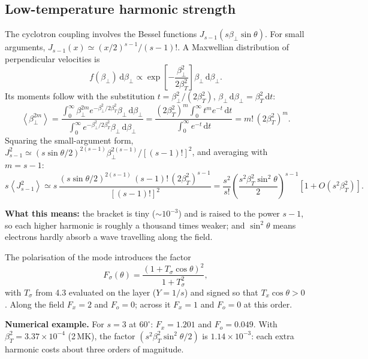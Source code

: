 \documentclass[11pt,a4paper]{article}
\newcommand{\dd}{\mathrm{d}}
\newcommand{\example}[1]{\par\noindent\colorbox{boxbg}{\parbox{\dimexpr\linewidth-2\fboxsep}{\small\textbf{Numerical example.} #1}}\par}
\newcommand{\whatitmeans}[1]{\par{\color{head}\textbf{What this means:}} #1\par}
\begin{document}
\subsection{Low-temperature harmonic strength}
The cyclotron coupling involves the Bessel functions $J_{s-1}(s\beta_\perp\sin\theta)$. For small
arguments, $J_{s-1}(x)\simeq(x/2)^{s-1}/(s-1)!$. A Maxwellian distribution of perpendicular
velocities is
\begin{equation}
  f(\beta_\perp)\,\dd\beta_\perp\propto\exp\!\left[-\frac{\beta_\perp^2}{2\beta_T^2}\right]\beta_\perp\,\dd\beta_\perp .
\end{equation}
Its moments follow with the substitution $t=\beta_\perp^2/(2\beta_T^2)$, $\beta_\perp\,\dd\beta_\perp=\beta_T^2\,\dd t$:
\begin{equation}
  \left\langle\beta_\perp^{2m}\right\rangle
  =\frac{\int_0^\infty\beta_\perp^{2m}e^{-\beta_\perp^2/2\beta_T^2}\beta_\perp\,\dd\beta_\perp}{\int_0^\infty e^{-\beta_\perp^2/2\beta_T^2}\beta_\perp\,\dd\beta_\perp}
  =\frac{(2\beta_T^2)^m\int_0^\infty t^me^{-t}\,\dd t}{\int_0^\infty e^{-t}\,\dd t}=m!\,(2\beta_T^2)^m .
\end{equation}
Squaring the small-argument form, $J_{s-1}^2\simeq(s\sin\theta/2)^{2(s-1)}\beta_\perp^{2(s-1)}/[(s-1)!]^2$, and averaging with $m=s-1$:
\begin{equation}
  s\left\langle J_{s-1}^2\right\rangle\simeq s\,\frac{(s\sin\theta/2)^{2(s-1)}\,(s-1)!\,(2\beta_T^2)^{s-1}}{[(s-1)!]^2}
  =\frac{s^2}{s!}\left(\frac{s^2\beta_T^2\sin^2\theta}{2}\right)^{s-1}\left[1+O(s^2\beta_T^2)\right].
\end{equation}
\whatitmeans{the bracket is tiny ($\sim10^{-3}$) and is raised to the power $s-1$, so each higher harmonic is roughly a
thousand times weaker; and $\sin^2\theta$ means electrons hardly absorb a wave travelling along the field.}
The polarisation of the mode introduces the factor
\begin{equation}
  F_\sigma(\theta)=\frac{(1+T_\sigma\cos\theta)^2}{1+T_\sigma^2},
\end{equation}
with $T_\sigma$ from 4.3 evaluated on the layer ($Y=1/s$) and signed so that $T_x\cos\theta>0$. Along the field
$F_x=2$ and $F_o=0$; across it $F_x=1$ and $F_o=0$ at this order.
\example{For $s=3$ at $60^\circ$: $F_x=1.201$ and $F_o=0.049$. With $\beta_T^2=3.37\times10^{-4}$
(2\,MK), the factor $(s^2\beta_T^2\sin^2\theta/2)$ is $1.14\times10^{-3}$: each extra harmonic costs about
three orders of magnitude.}
\end{document}
